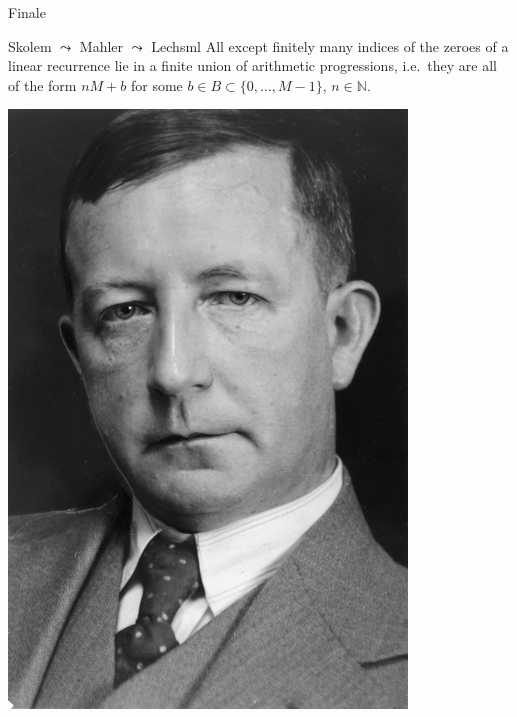 \documentclass[notheorems]{beamer}
\theoremstyle{plain}
\newcommand{\NN}{\mathbb{N}}
\begin{document}
\begin{frame}{Finale}
    \begin{theorem}{Skolem \(\leadsto\) Mahler \(\leadsto\) Lech}{sml}
        All except finitely many indices of the zeroes of a linear recurrence lie in a finite union of arithmetic progressions, i.e.\ they are all of the form \(nM + b\) for some \(b \in B \subset \{0, \ldots, M-1\}\), \(n \in \NN\).%
    \end{theorem}
    \pause
    \includegraphics[height = 0.6\textheight]{skolem.jpeg}
\end{frame}
\end{document}
